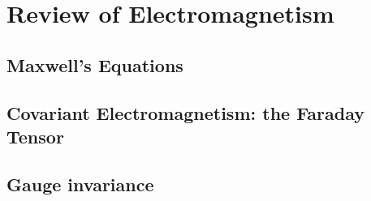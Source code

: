 \chapter{Review of Electromagnetism}

\section{Maxwell's Equations}

\section{Covariant Electromagnetism: the Faraday Tensor}

\section{Gauge invariance}